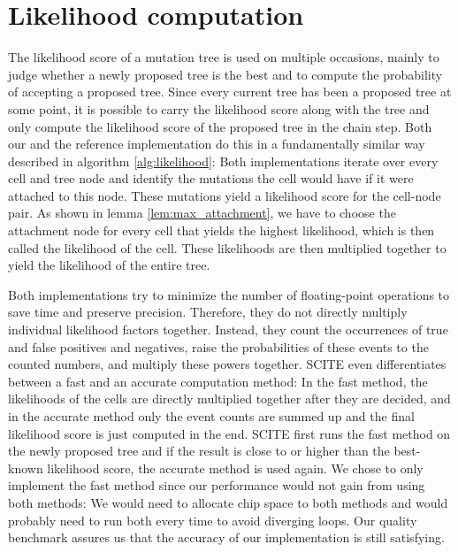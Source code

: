 \section{Likelihood computation}
\label{sec:scoring}

The likelihood score of a mutation tree is used on multiple occasions, mainly to judge whether a newly proposed tree is the best and to compute the probability of accepting a proposed tree. Since every current tree has been a proposed tree at some point, it is possible to carry the likelihood score along with the tree and only compute the likelihood score of the proposed tree in the chain step. Both our and the reference implementation do this in a fundamentally similar way described in algorithm \ref{alg:likelihood}: Both implementations iterate over every cell and tree node and identify the mutations the cell would have if it were attached to this node. These mutations yield a likelihood score for the cell-node pair. As shown in lemma \ref{lem:max_attachment}, we have to choose the attachment node for every cell that yields the highest likelihood, which is then called the likelihood of the cell. These likelihoods are then multiplied together to yield the likelihood of the entire tree.

Both implementations try to minimize the number of floating-point operations to save time and preserve precision. Therefore, they do not directly multiply individual likelihood factors together. Instead, they count the occurrences of true and false positives and negatives, raise the probabilities of these events to the counted numbers, and multiply these powers together. \ac{SCITE} even differentiates between a fast and an accurate computation method: In the fast method, the likelihoods of the cells are directly multiplied together after they are decided, and in the accurate method only the event counts are summed up and the final likelihood score is just computed in the end. \ac{SCITE} first runs the fast method on the newly proposed tree and if the result is close to or higher than the best-known likelihood score, the accurate method is used again. We chose to only implement the fast method since our performance would not gain from using both methods: We would need to allocate chip space to both methods and would probably need to run both every time to avoid diverging loops. Our quality benchmark assures us that the accuracy of our implementation is still satisfying.


